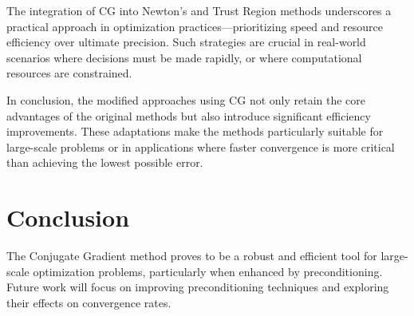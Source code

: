 \documentclass[11pt]{article}
\begin{document}
The integration of CG into Newton's and Trust Region methods underscores a practical approach in optimization practices—prioritizing speed and resource efficiency over ultimate precision. Such strategies are crucial in real-world scenarios where decisions must be made rapidly, or where computational resources are constrained.

In conclusion, the modified approaches using CG not only retain the core advantages of the original methods but also introduce significant efficiency improvements. These adaptations make the methods particularly suitable for large-scale problems or in applications where faster convergence is more critical than achieving the lowest possible error.

\section{Conclusion}

The Conjugate Gradient method proves to be a robust and efficient tool for large-scale optimization problems, particularly when enhanced by preconditioning. Future work will focus on improving preconditioning techniques and exploring their effects on convergence rates.
\end{document}
